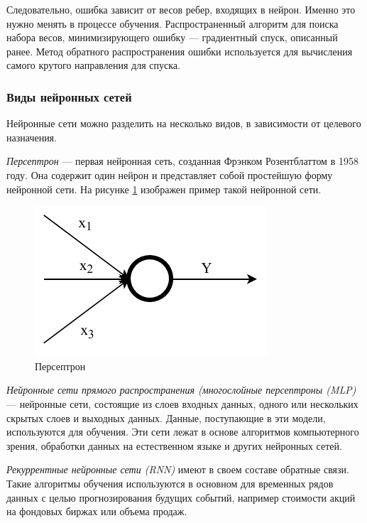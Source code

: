 Следовательно, ошибка зависит от весов ребер, входящих в нейрон. Именно это нужно менять в процессе обучения. Распространенный алгоритм для поиска набора весов, минимизирующего ошибку --- градиентный спуск, описанный ранее. Метод обратного распространения ошибки используется для вычисления самого крутого направления для спуска.

\subsubsection{Виды нейронных сетей}

Нейронные сети можно разделить на несколько видов, в зависимости от целевого назначения. 

\textit{Персептрон} --- первая нейронная сеть, созданная Фрэнком Розентблаттом в 1958 году. Она содержит один нейрон и представляет собой простейшую форму нейронной сети. На рисунке \ref{fig:perceptron} изображен пример такой нейронной сети.

\begin{figure}[H]
	\centering
	\includegraphics[width=\textwidth]{img/perceptron.pdf}
	\caption{Персептрон}
	\label{fig:perceptron}
\end{figure}

\textit{Нейронные сети прямого распространения (многослойные персептроны (MLP)} --- нейронные сети, состоящие из слоев входных данных, одного или нескольких скрытых слоев и выходных данных. Данные, поступающие в эти модели, используются для обучения. Эти сети лежат в основе алгоритмов компьютерного зрения, обработки данных на естественном языке и других нейронных сетей.

\textit{Рекуррентные нейронные сети (RNN)} имеют в своем составе обратные связи. Такие алгоритмы обучения используются в основном для временных рядов данных с целью прогнозирования будущих событий, например стоимости акций на фондовых биржах или объема продаж.

